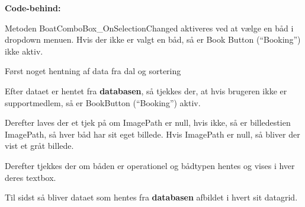 \textbf{Code-behind:}

Metoden BoatComboBox\_OnSelectionChanged aktiveres ved at vælge en båd i dropdown menuen. 
Hvis der ikke er valgt en båd, så er Book Button (``Booking'') ikke aktiv. 

Først noget hentning af data fra dal og sortering

Efter dataet er hentet fra \textbf{databasen}, så tjekkes der, at hvis brugeren ikke er supportmedlem, så er BookButton (``Booking'') aktiv. 

Derefter laves der et tjek på om ImagePath er null, hvis ikke, så er billedestien ImagePath, så hver båd har sit eget billede. 
Hvis ImagePath er null, så bliver der vist et gråt billede.

Derefter tjekkes der om båden er operationel og bådtypen hentes og vises i hver deres textbox. 

Til sidst så bliver dataet som hentes fra \textbf{databasen} afbildet i hvert sit datagrid.


